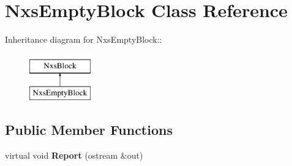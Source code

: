 \hypertarget{classNxsEmptyBlock}{
\section{NxsEmptyBlock Class Reference}
\label{classNxsEmptyBlock}
}
Inheritance diagram for NxsEmptyBlock::\begin{figure}[H]
\begin{center}
\leavevmode
\includegraphics[height=2cm]{classNxsEmptyBlock}
\end{center}
\end{figure}
\subsection*{Public Member Functions}
\begin{DoxyCompactItemize}
\item 
\hypertarget{classNxsEmptyBlock_a9dc245da7055805dffd8ee400b2e24ae}{
virtual void {\bfseries Report} (ostream \&out)}
\label{classNxsEmptyBlock_a9dc245da7055805dffd8ee400b2e24ae}

\end{DoxyCompactItemize}
